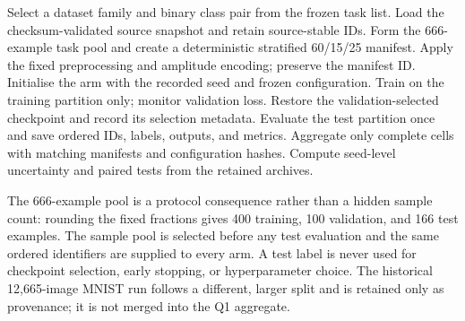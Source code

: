\documentclass[conference]{IEEEtran}
\begin{document}
\begin{algorithm}[!t]
\caption{Registered training and evaluation protocol}
\label{alg:protocol}
\begin{algorithmic}[1]
\STATE Select a dataset family and binary class pair from the frozen task list.
\STATE Load the checksum-validated source snapshot and retain source-stable IDs.
\STATE Form the 666-example task pool and create a deterministic stratified 60/15/25 manifest.
\STATE Apply the fixed preprocessing and amplitude encoding; preserve the manifest ID.
  \STATE Initialise the arm with the recorded seed and frozen configuration.
  \STATE Train on the training partition only; monitor validation loss.
  \STATE Restore the validation-selected checkpoint and record its selection metadata.
  \STATE Evaluate the test partition once and save ordered IDs, labels, outputs, and metrics.
\ENDFOR
\STATE Aggregate only complete cells with matching manifests and configuration hashes.
\STATE Compute seed-level uncertainty and paired tests from the retained archives.
\end{algorithmic}
\end{algorithm}

The 666-example pool is a protocol consequence rather than a hidden sample
count: rounding the fixed fractions gives 400 training, 100 validation, and
166 test examples. The sample pool is selected before any test evaluation and
the same ordered identifiers are supplied to every arm. A test label is never
used for checkpoint selection, early stopping, or hyperparameter choice. The
historical 12,665-image MNIST run follows a different, larger split and is
retained only as provenance; it is not merged into the Q1 aggregate.
\end{document}
